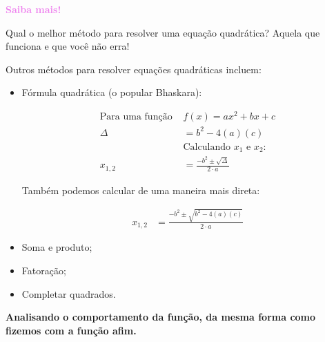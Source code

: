 \documentclass[12pt,openright,twoside,a4paper]{article}
\theoremstyle{definition}
\begin{document}
	\begin{snugshade}
		\textbf{\textcolor{violet}{Saiba mais!}}
		
		Qual o melhor método para resolver uma equação quadrática? Aquela que funciona e que você não erra!
		
		Outros métodos para resolver equações quadráticas incluem:
		
		\begin{itemize}
			\item Fórmula quadrática (o popular Bhaskara):
			
				\begin{align*}
					\text{Para uma função } & f(x) = ax^2 + bx + c\\
					\Delta &= b^2 - 4(a)(c)\\
					&\text{Calculando $x_1$ e $x_2$:}\\
					x_{1,2} &= \frac{- b^2 \pm \sqrt{\Delta}}{2 \cdot a}
				\end{align*}
				
				Também podemos calcular de uma maneira mais direta:
				
				\begin{align*}
					x_{1,2} &= \frac{- b^2 \pm \sqrt{b^2 - 4(a)(c)}}{2 \cdot a}
				\end{align*}
			
			\item Soma e produto;
			\item Fatoração;
			\item Completar quadrados.
		\end{itemize}
	\end{snugshade}
	
	\textbf{Analisando o comportamento da função, da mesma forma como fizemos com a função afim.}
	
\end{document}
